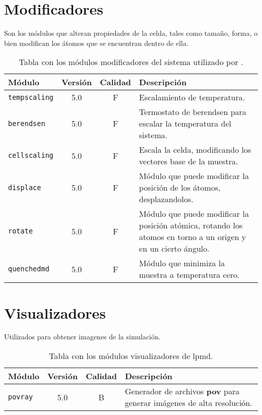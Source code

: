 \section{Modificadores}
Son los m\'odulos que alteran propiedades de la celda, tales como tama\~no, forma, o bien modifican los \'atomos que se encuentran dentro de ella.
\begin{table}[h!]
 \begin{tabular}{|l|c|c|p{10cm}|}\hline
 M\'odulo & Versi\'on & Calidad & Descripci\'on \\
 \hline\hline
 \texttt{tempscaling} & 5.0 & F & Escalamiento de temperatura.\\
 \hline
 \texttt{berendsen} & 5.0 & F & Termostato de berendsen para escalar la temperatura del sistema.\\
 \hline
 \texttt{cellscaling} & 5.0 & F & Escala la celda, modificando los vectores base de la muestra.\\
 \hline
 \texttt{displace} & 5.0 & F & M\'odulo que puede modificar la posici\'on de los \'atomos, desplazandolos.\\
 \hline
 \texttt{rotate} & 5.0 & F & M\'odulo que puede modificar la posici\'on at\'omica, rotando los atomos en torno a un origen y en un cierto \'angulo.\\
 \hline
 \texttt{quenchedmd} & 5.0 & F & M\'odulo que minimiza la muestra a temperatura cero.\\
 \hline
 \end{tabular}
\label{tab:modmodify}
\caption{Tabla con los m\'odulos modificadores del sistema utilizado por {\lpmd}.}
\end{table}

\section{Visualizadores}
Utilizados para obtener imagenes de la simulaci\'on.

\begin{table}[h!]
 \begin{tabular}{|l|c|c|p{10cm}|}\hline
 M\'odulo & Versi\'on & Calidad & Descripci\'on \\
 \hline\hline
 \texttt{povray} & 5.0 & B & Generador de archivos \textbf{pov} para generar im\'agenes de alta resoluci\'on.\\
 \hline
 \end{tabular}
\label{tab:modgvisual}
\caption{Tabla con los m\'odulos visualizadores de lpmd.}
\end{table}


